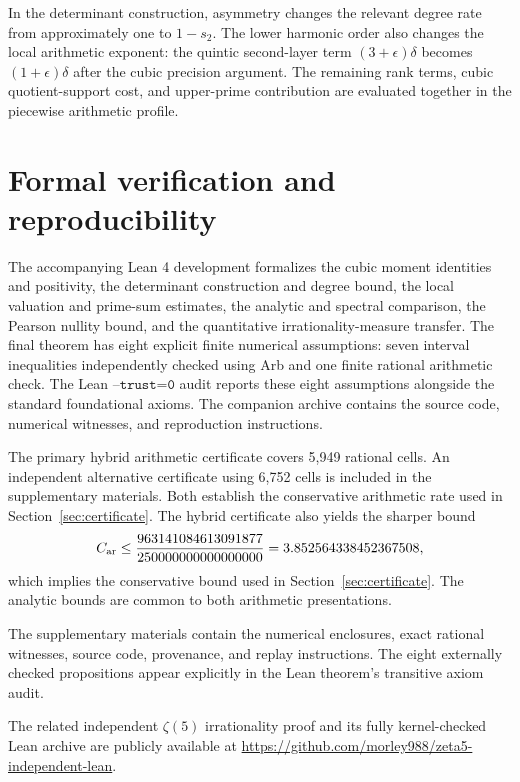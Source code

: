 \documentclass[11pt]{article}
\theoremstyle{definition}\newtheorem{definition}[theorem]{Definition}
\theoremstyle{remark}\newtheorem{remark}[theorem]{Remark}
\begin{document}
In the determinant construction, asymmetry changes the relevant degree rate from approximately one to $1-s_2$. The lower harmonic order also changes the local arithmetic exponent: the quintic second-layer term $(3+\epsilon)\delta$ becomes $(1+\epsilon)\delta$ after the cubic precision argument. The remaining rank terms, cubic quotient-support cost, and upper-prime contribution are evaluated together in the piecewise arithmetic profile.


\section{Formal verification and reproducibility}\label{sec:repro}
The accompanying Lean 4 development formalizes the cubic moment identities and positivity, the determinant construction and degree bound, the local valuation and prime-sum estimates, the analytic and spectral comparison, the Pearson nullity bound, and the quantitative irrationality-measure transfer. The final theorem has eight explicit finite numerical assumptions: seven interval inequalities independently checked using Arb and one finite rational arithmetic check. The Lean $\texttt{--trust=0}$ audit reports these eight assumptions alongside the standard foundational axioms. The companion archive contains the source code, numerical witnesses, and reproduction instructions.

The primary hybrid arithmetic certificate covers 5,949 rational cells. An independent alternative certificate using 6,752 cells is included in the supplementary materials. Both establish the conservative arithmetic rate used in Section~\ref{sec:certificate}. The hybrid certificate also yields the sharper bound
\[
 C_{\rm ar}\le\frac{963141084613091877}{250000000000000000}
 =3.852564338452367508,
\]
which implies the conservative bound used in Section~\ref{sec:certificate}. The analytic bounds are common to both arithmetic presentations.

The supplementary materials contain the numerical enclosures, exact rational witnesses, source code, provenance, and replay instructions. The eight externally checked propositions appear explicitly in the Lean theorem's transitive axiom audit.

The related independent $\zeta(5)$ irrationality proof and its fully kernel-checked Lean archive are publicly available at
\url{https://github.com/morley988/zeta5-independent-lean}.
\end{document}
